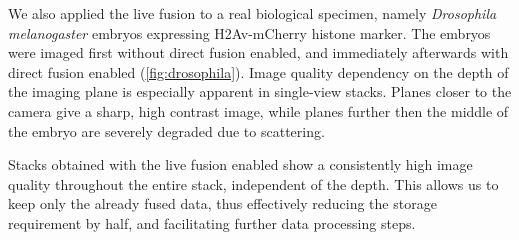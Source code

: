   We also applied the live fusion to a real biological specimen, namely \textit{Drosophila melanogaster} embryos expressing H2Av-mCherry histone marker. The embryos were imaged first without direct fusion enabled, and immediately afterwards with direct fusion enabled (\autoref{fig:drosophila}). Image quality dependency on the depth of the imaging plane is especially apparent in single-view stacks. Planes closer to the camera give a sharp, high contrast image, while planes further then the middle of the embryo are severely degraded due to scattering.

  Stacks obtained with the live fusion enabled show a consistently high image quality throughout the entire stack, independent of the depth. This allows us to keep only the already fused data, thus effectively reducing the storage requirement by half, and facilitating further data processing steps. 










  
